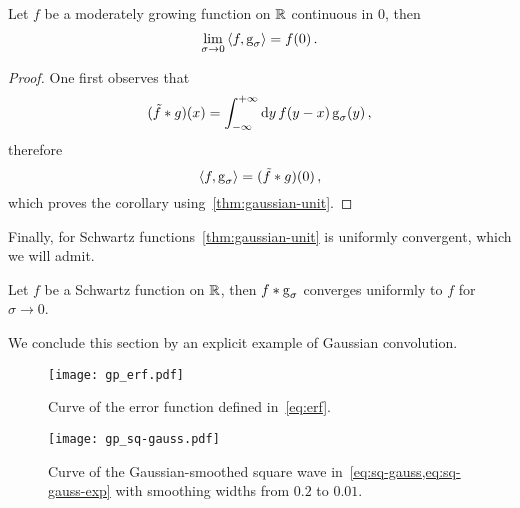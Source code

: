 \begin{corollary}
  Let $f$ be a moderately growing function on $\mathbb{R}$ continuous in $0$, then
  \begin{equation}
    \lim_{\sigma\to0}\braket{f,\operatorname{g}_{\sigma}}=f(0)\,.
  \end{equation}
\end{corollary}
\begin{proof}
  One first observes that
  \begin{equation}
    (\tilde{f}\ast g)(x)=\int_{-\infty}^{+\infty}\mathrm{d}{y}\,f(y-x)\operatorname{g}_{\sigma}(y)\,,
  \end{equation}
  therefore
  \begin{equation}
    \braket{f,\operatorname{g}_{\sigma}}=(\tilde{f}\ast g)(0)\,,
  \end{equation}
  which proves the corollary using~\cref{thm:gaussian-unit}.
\end{proof}
Finally, for Schwartz functions~\cref{thm:gaussian-unit} is uniformly convergent, which
we will admit.
\begin{theorem}
  Let $f$ be a Schwartz function on $\mathbb{R}$, then $f\ast \operatorname{g}_{\sigma}$ converges uniformly
  to $f$ for $\sigma\to 0$.
\end{theorem}
We conclude this section by an explicit example of Gaussian convolution.
\begin{figure}[t]
  \centering
  \texttt{[image: gp\_erf.pdf]}
  \caption{Curve of the error function defined in~\cref{eq:erf}.}
  \label{fig:erf}
\end{figure}
\begin{figure}[htbp]
  \centering
  \texttt{[image: gp\_sq-gauss.pdf]}
  \caption{Curve of the Gaussian-smoothed square wave
  in~\cref{eq:sq-gauss,eq:sq-gauss-exp} with smoothing widths from $0.2$ to $0.01$.}
  \label{fig:sq-gauss}
\end{figure}
